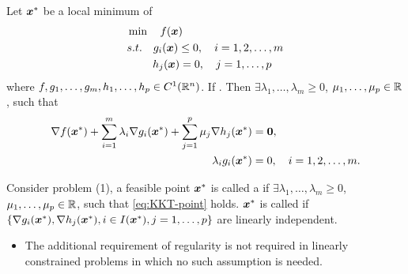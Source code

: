 \documentclass[10pt,a4paper]{book}
\begin{document}
\begin{thmbox}
	\begin{theorem}\label{thm:KKT-ineq_eq_constrained}
		Let ${\boldsymbol x}^*$ be a local minimum of 
		\begin{equation}\label{eq:KKT-ineq_eq}
			\begin{aligned}
				&\min\quad  f({\boldsymbol x})\\
				&s.t.\quad  g_i({\boldsymbol x})\leq0,\quad i=1,2,\ldots,m\\
				&\quad\quad\ h_j({\boldsymbol x})=0,\quad j=1,\ldots,p
				\end{aligned}	
		\end{equation}
		where $f,g_1,\ldots,g_m,h_1,\ldots,h_p\in C^1(\mathbb R^n)$. If . Then $\exists \lambda_1,\ldots,\lambda_m\geq 0$, $\mu_1,\ldots,\mu_p\in\mathbb R$,  such that 
		\begin{equation}\label{eq:KKT-point}
			\begin{aligned}
				\nabla f({\boldsymbol x}^*)+\sum_{i=1}^m\lambda_i\nabla g_i({\boldsymbol x}^*) + \sum_{j=1}^{p}\mu_j\nabla h_j({\boldsymbol x}^*)& ={\boldsymbol 0}, \\
				\lambda_ig_i({\boldsymbol x}^*)& =0, \quad i=1,2,\ldots,m.
			\end{aligned} 
		\end{equation} 
	\end{theorem}	
\end{thmbox}
Consider problem (1), a feasible point ${\boldsymbol x}^*$ is called a 
if $\exists \lambda_1,\ldots,\lambda_m\geq 0$, $\mu_1,\ldots,\mu_p\in\mathbb R$, such that \eqref{eq:KKT-point} holds. ${\boldsymbol x}^*$ is called  if $\{\nabla g_i({\boldsymbol x}^*),\nabla h_j({\boldsymbol x}^*),i\in I({\boldsymbol x}^*),j=1,\ldots,p\}$ are linearly independent.
\begin{itemize}
	\item The additional requirement of regularity is not required in linearly
	constrained problems in which no such assumption is needed.
\end{itemize}










\end{document}
